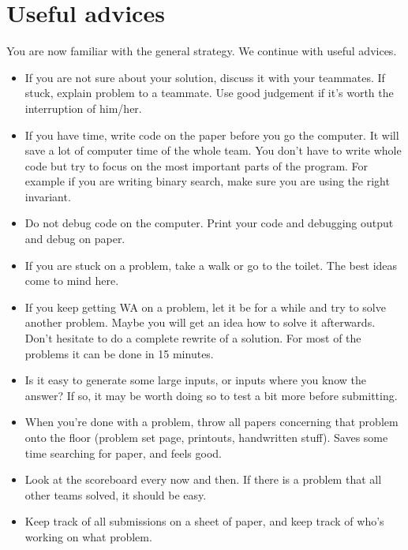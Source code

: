 \documentclass{article}
\begin{document}
\section{Useful advices}
You are now familiar with the general strategy. We continue with useful advices.
\begin{itemize}
  \item If you are not sure about your solution, discuss it with your teammates.
  If stuck, explain problem to a teammate. Use good judgement if it's worth the
  interruption of him/her.

  \item If you have time, write code on the paper before you go the computer. It
  will save a lot of computer time of the whole team. You don't have to write
  whole code but try to focus on the most important parts of the program. For
  example if you are writing binary search, make sure you are using the right
  invariant.

  \item Do not debug code on the computer. Print your code and debugging output
  and debug on paper.

  \item If you are stuck on a problem, take a walk or go to the toilet. The best
  ideas come to mind here.

  \item If you keep getting WA on a problem, let it be for a while and try to
  solve another problem. Maybe you will get an idea how to solve it afterwards.
  Don't hesitate to do a complete rewrite of a solution. For most of the
  problems it can be done in 15 minutes.

  \item Is it easy to generate some large inputs, or inputs where you know the
  answer? If so, it may be worth doing so to test a bit more before submitting.

  \item When you're done with a problem, throw all papers concerning that
  problem onto the floor (problem set page, printouts, handwritten stuff). Saves
  some time searching for paper, and feels good.

  \item Look at the scoreboard every now and then. If there is a problem that
  all other teams solved, it should be easy.

  \item Keep track of all submissions on a sheet of paper, and keep track of
  who's working on what problem.


\end{itemize}
\end{document}
